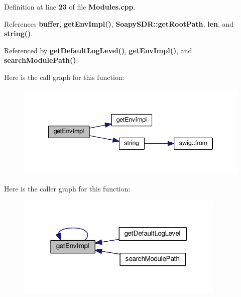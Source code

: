 Definition at line {\bf 23} of file {\bf Modules.\+cpp}.



References {\bf buffer}, {\bf get\+Env\+Impl()}, {\bf Soapy\+S\+D\+R\+::get\+Root\+Path}, {\bf len}, and {\bf string()}.



Referenced by {\bf get\+Default\+Log\+Level()}, {\bf get\+Env\+Impl()}, and {\bf search\+Module\+Path()}.



Here is the call graph for this function\+:
\nopagebreak
\begin{figure}[H]
\begin{center}
\leavevmode
\includegraphics[width=346pt]{df/da4/LoggerC_8cpp_aa515d0f19e269024c2610104d65f04c5_cgraph}
\end{center}
\end{figure}




Here is the caller graph for this function\+:
\nopagebreak
\begin{figure}[H]
\begin{center}
\leavevmode
\includegraphics[width=283pt]{df/da4/LoggerC_8cpp_aa515d0f19e269024c2610104d65f04c5_icgraph}
\end{center}
\end{figure}


